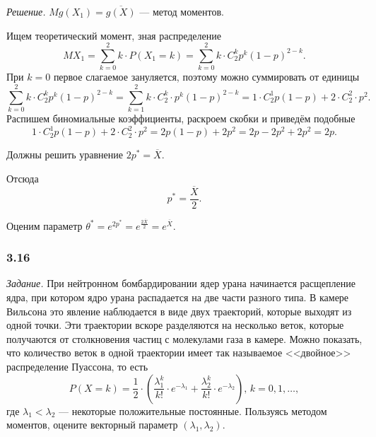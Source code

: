 \textit{Решение.} $Mg \left( X_1 \right) = \overline{g \left( X \right) }$ --- метод моментов.

Ищем теоретический момент, зная распределение
$$MX_1 =
  \sum \limits_{k = 0}^2 k \cdot P \left( X_1 = k \right) =
  \sum \limits_{k = 0}^2 k \cdot C_2^k p^k \left( 1 - p \right)^{2 - k}.$$
При $k = 0$ первое слагаемое зануляется, поэтому можно суммировать от единицы
$$ \sum \limits_{k = 0}^2 k \cdot C_2^k p^k \left( 1 - p \right)^{2 - k} =
  \sum \limits_{k = 1}^2 k \cdot C_2^k \cdot p^k \left( 1 - p \right)^{2 - k} =
  1 \cdot C_2^1 p \left( 1 - p \right) + 2 \cdot C_2^2 \cdot p^2.$$
Распишем биномиальные коэффициенты, раскроем скобки и приведём подобные
$$1 \cdot C_2^1 p \left( 1 - p \right) + 2 \cdot C_2^2 \cdot p^2 =
  2p \left( 1 - p \right) + 2p^2 =
  2p - 2p^2 + 2p^2 =
  2p.$$

Должны решить уравнение $2p^* = \overline{X}$.

Отсюда
$$p^* =
  \frac{ \overline{X}}{2}.$$

Оценим параметр $ \theta^* = e^{2p^*} = e^{ \frac{2 \overline{X}}{2}} = e^{ \overline{X}}$.

\subsubsection*{3.16}

\textit{Задание.} При нейтронном бомбардировании ядер урана начинается расщепление ядра,
при котором ядро урана распадается на две части разного типа.
В камере Вильсона это явление наблюдается в виде двух траекторий, которые выходят из одной точки.
Эти траектории вскоре разделяются на несколько веток,
которые получаются от столкновения частиц с молекулами газа в камере.
Можно показать,
что количество веток в одной траектории имеет так называемое <<двойное>> распределение Пуассона,
то есть
$$P \left( X = k \right) =
  \frac{1}{2} \cdot
  \left(
    \frac{ \lambda_1^k}{k!} \cdot e^{- \lambda_1} + \frac{ \lambda_2^k}{k!} \cdot e^{- \lambda_2}
  \right), \,
  k = 0, 1, \dotsc,$$
где $ \lambda_1 < \lambda_2$ --- некоторые положительные постоянные.
Пользуясь методом моментов, оцените векторный параметр $ \left( \lambda_1, \lambda_2 \right) $.

